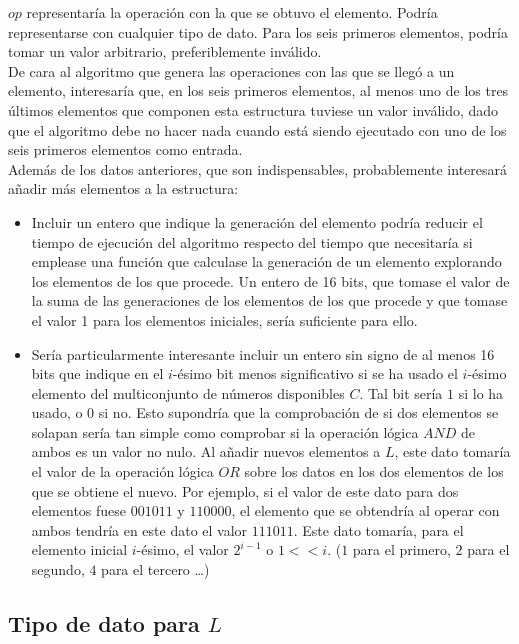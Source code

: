 $op$ representaría la operación con la que se obtuvo el elemento.
Podría representarse con cualquier tipo de dato. Para los seis primeros
elementos, podría tomar un valor arbitrario, preferiblemente inválido.\\

De cara al algoritmo que genera las operaciones con las que se llegó a un
elemento, interesaría que, en los seis primeros elementos, al menos uno de los
tres últimos elementos que componen esta estructura tuviese un valor inválido,
dado que el algoritmo debe no hacer nada cuando está siendo ejecutado con uno
de los seis primeros elementos como entrada. \\

Además de los datos anteriores, que son indispensables, probablemente interesará
 añadir más elementos a la estructura:

\begin{itemize}
	\item Incluir un entero que indique la generación del elemento podría reducir
	el tiempo de ejecución del algoritmo respecto del tiempo que necesitaría si
	emplease una función que calculase la generación de un elemento explorando los
	 elementos de los que procede. Un entero de 16 bits, que tomase el valor de la
	  suma de las generaciones de los elementos de los que procede y que tomase el
		 valor 1 para los elementos iniciales, sería suficiente para ello.
	\item Sería particularmente interesante incluir un entero sin signo de al
	menos 16 bits que indique en el $i$-ésimo bit menos significativo si se ha
	usado el $i$-ésimo elemento del multiconjunto de números disponibles $C$. Tal
	bit sería $1$ si lo ha usado, o $0$ si no. Esto supondría que la comprobación
	de si dos elementos se solapan sería tan simple como comprobar si la operación
	lógica $AND$ de ambos es un valor no nulo. Al añadir nuevos elementos a $L$,
	este dato tomaría el valor de la operación lógica $OR$ sobre los datos en los
	dos elementos de los que se obtiene el nuevo. Por ejemplo, si el valor de
	este dato para dos elementos fuese $001011$ y $110000$, el elemento que se
	obtendría al operar con ambos tendría en este dato el valor $111011$. Este
	dato tomaría, para el elemento inicial $i$-ésimo, el valor $2^{i-1}$ o
	$1 << i$. ($1$ para el primero, $2$ para el segundo, $4$ para el tercero \ldots)
\end{itemize}

\subsection{Tipo de dato para $L$}
